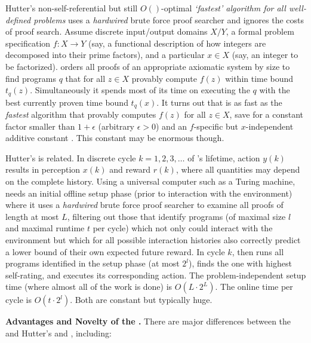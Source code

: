\begin{enumerate}
Hutter's non-self-referential but still $O()$-optimal 
{\em `fastest' algorithm for all well-defined problems}
\hs \cite{Hutter:01fast+} 
uses a {\em hardwired} brute force proof searcher  and
ignores the costs of proof search.
Assume discrete input/output domains $X/Y$, a formal problem
specification $f: X \rightarrow Y$
(say, a functional description of how integers are decomposed
into their prime factors),
and a particular $x \in X$ (say,
an integer to be factorized). \hs
orders all proofs of an appropriate axiomatic system
by size to find programs $q$ that
for all $z \in X$ provably compute $f(z)$
within time bound $t_q(z)$. Simultaneously it
spends most of its time on executing the $q$ with the
best currently proven time bound $t_q(x)$.
It turns out that \hs
is as fast as the {\em fastest} algorithm that provably
computes $f(z)$ for all $z \in X$, save for a constant factor
smaller than $1 + \epsilon$ (arbitrary $\epsilon > 0$)
and an $f$-specific but $x$-independent
additive constant  \cite{Hutter:01fast+}.
This constant may be enormous though.

Hutter's \tl \cite{Hutter:01aixi+}
is related.
In discrete cycle $k=1,2,3, \ldots$ of \tln's lifetime,
action $y(k)$ results in perception $x(k)$ and reward $r(k)$,
where all quantities may depend on the complete history.
Using a universal computer such as a Turing machine,
\tl needs an initial offline
setup phase (prior to interaction with the environment) where
it uses a {\em hardwired} brute force proof searcher to
examine all proofs of length at
most $L$, filtering out those that identify programs (of maximal
size $l$ and maximal runtime $t$ per cycle) which not only
could interact with the environment but which for
all possible interaction histories
also correctly predict a lower bound of their own expected future reward.
In cycle $k$, \tl then runs all programs
identified in the
setup phase (at most $2^l$), finds the one with highest self-rating,
and executes its corresponding action.
The problem-independent setup time (where almost all of the work is done)
is $O(L \cdot 2^{L})$.  The online time per cycle is $O(t \cdot 2^l)$.
Both are constant but typically huge.

\noindent
{\bf Advantages and Novelty of the \GMn.}
There are major differences between the \gm and Hutter's
\hs \cite{Hutter:01fast+} and \tl \cite{Hutter:01aixi+}, including:


\end{enumerate}

